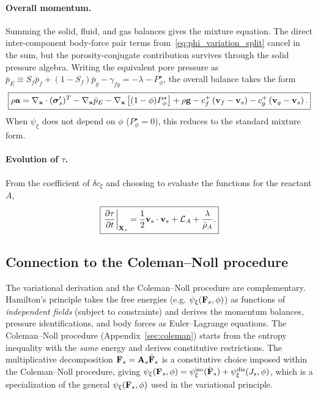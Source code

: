 \paragraph{Overall momentum.}  Summing the solid, fluid, and gas balances gives the mixture equation.  The direct inter-component body-force pair terms from~\eqref{eq:phi_variation_split} cancel in the sum, but the porosity-conjugate contribution survives through the solid pressure algebra.  Writing the equivalent pore pressure as $\bar p_E \equiv S_f\bar p_f + (1-S_f)\bar p_g-\gamma_{fg}=-\lambda-P^\star_\phi$, the overall balance takes the form
\begin{equation}
  \boxed{\rho\mathbf{a} = \nabla_{\mathbf{x}}\cdot(\boldsymbol{\sigma}'_s)^T - \nabla_{\mathbf{x}}\bar p_E - \nabla_{\mathbf{x}}\left[(1-\phi)P^\star_\phi\right] + \rho\mathbf{g} - c^+_f\left(\mathbf{v}_f - \mathbf{v}_s\right) - c^+_g\left(\mathbf{v}_g - \mathbf{v}_s\right).}
  \label{eq:mom_overall}
\end{equation}
When $\psi_\xi$ does not depend on $\phi$ ($P^\star_\phi = 0$), this reduces to the standard mixture form.

\paragraph{Evolution of $\tau$.}  From the coefficient of $\delta c_\xi$ and choosing to evaluate the functions for the reactant $A$,
\begin{equation}
  \boxed{\left.\frac{\partial \tau}{\partial t}\right|_{\mathbf{X}_s} = \frac{1}{2}\mathbf{v}_s\cdot\mathbf{v}_s + \mathcal{L}_A + \frac{\lambda}{\bar\rho_A}.}
  \label{eq:tau_final}
\end{equation}

\subsection{Connection to the Coleman--Noll procedure}
\label{sec:coleman_connection}

The variational derivation and the Coleman--Noll procedure are complementary.  Hamilton's principle takes the free energies (e.g. $\psi_\xi(\mathbf{F}_s, \phi)$) as functions of \emph{independent fields} (subject to constraints) and derives the momentum balances, pressure identifications, and body forces as Euler--Lagrange equations.  The Coleman--Noll procedure (Appendix~\ref{sec:coleman}) starts from the entropy inequality with the \emph{same} energy and derives constitutive restrictions.  The multiplicative decomposition $\mathbf{F}_s = \mathbf{A}_s \bar{\mathbf{F}}_s$ is a constitutive choice imposed within the Coleman--Noll procedure, giving $\psi_\xi(\mathbf{F}_s, \phi) = \psi^{\text{iso}}_\xi(\bar{\mathbf{F}}_s) + \psi^{\text{dis}}_\xi(J_s, \phi)$, which is a specialization of the general $\psi_\xi(\mathbf{F}_s, \phi)$ used in the variational principle.
